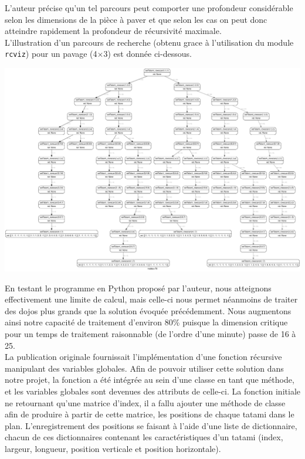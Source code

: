 L’auteur précise qu’un tel parcours peut comporter une profondeur considérable selon les dimensions de la pièce
à paver et que selon les cas on peut donc atteindre rapidement la profondeur de récursivité maximale.\\

L'illustration d'un parcours de recherche (obtenu grace à l'utilisation du module \texttt{rcviz}) pour un pavage (4$\times$3) est donnée ci-dessous.\\

\begin{adjustwidth}{-1.5cm}{0cm}
    \includegraphics[width=19cm]{images/arbre4x3.pdf}
\end{adjustwidth}


En testant le programme en Python proposé par l’auteur, nous atteignons effectivement une limite de calcul,
mais celle-ci nous permet néanmoins de traiter des dojos plus grands que la solution évoquée précédemment.
Nous augmentons ainsi notre capacité de traitement d’environ 80\% puisque la dimension critique pour un temps de traitement raisonnable
(de l'ordre d'une minute) passe de 16 à 25.\\

La publication originale fournissait l’implémentation d’une fonction récursive manipulant des variables globales.
Afin de pouvoir utiliser cette solution dans notre projet, la fonction a été intégrée au sein d’une classe en tant que méthode,
et les variables globales sont devenues des attributs de celle-ci. La fonction initiale ne retournant qu’une matrice d’index,
il a fallu ajouter une méthode de classe afin de produire à partir de cette matrice, les positions de chaque tatami dans le plan.
L’enregistrement des positions se faisant à l’aide d’une liste de dictionnaire, chacun de ces dictionnaires contenant
les caractéristiques d’un tatami (index, largeur, longueur, position verticale et position horizontale).



